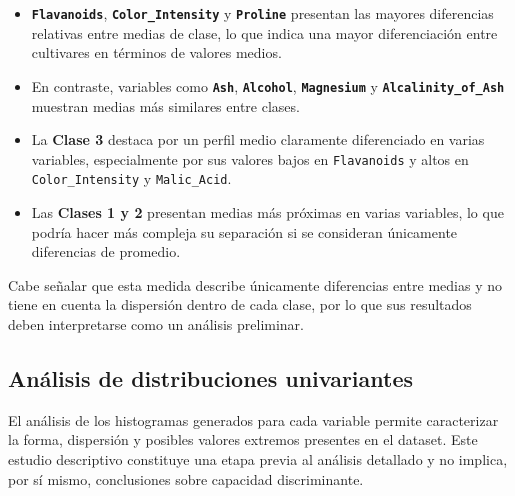 \begin{itemize}

    \item \textbf{\texttt{Flavanoids}}, \textbf{\texttt{Color\_Intensity}} y 
    \textbf{\texttt{Proline}} presentan las mayores diferencias relativas entre
    medias de clase, lo que indica una mayor diferenciación entre cultivares
    en términos de valores medios.

    \item En contraste, variables como \textbf{\texttt{Ash}},
    \textbf{\texttt{Alcohol}}, \textbf{\texttt{Magnesium}} y
    \textbf{\texttt{Alcalinity\_of\_Ash}} muestran medias más similares entre
    clases.

    \item La \textbf{Clase 3} destaca por un perfil medio claramente diferenciado
    en varias variables, especialmente por sus valores bajos en
    \texttt{Flavanoids} y altos en \texttt{Color\_Intensity} y
    \texttt{Malic\_Acid}.

    \item Las \textbf{Clases 1 y 2} presentan medias más próximas en varias
    variables, lo que podría hacer más compleja su separación si se consideran
    únicamente diferencias de promedio.

\end{itemize}

Cabe señalar que esta medida describe únicamente diferencias entre medias y
no tiene en cuenta la dispersión dentro de cada clase, por lo que sus resultados
deben interpretarse como un análisis preliminar.

\subsection{Análisis de distribuciones univariantes}

El análisis de los histogramas generados para cada variable permite caracterizar
la forma, dispersión y posibles valores extremos presentes en el dataset. Este
estudio descriptivo constituye una etapa previa al análisis detallado
y no implica, por sí mismo, conclusiones sobre capacidad discriminante.

